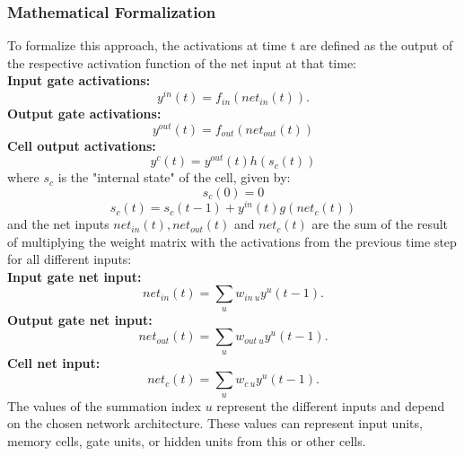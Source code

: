 \documentclass[twoside,a4paper,10pt,DIV=12,BCOR=12mm]{scrartcl}
\begin{document}
\subsubsection{Mathematical Formalization}
To formalize this approach, the activations at time t are defined as the output of the respective activation function of the net input at that time:\\
\textbf{Input gate activations:}
\begin{equation}
\label{eqn:poo-act-in}
y^{in}(t)=f_{in}\left(net_{in}(t)\right).
\end{equation}
\textbf{Output gate activations:}
\begin{equation}
\label{eqn:poo-act-out}
y^{out}(t)=f_{out}\left(net_{out}(t)\right)
\end{equation}
\textbf{Cell output activations:}
\begin{equation}
\label{eqn:poo-act-c}
y^{c}(t)=y^{out}(t)h\left(s_c(t)\right)
\end{equation}
where \begin{math}s_c\end{math} is the "internal state" of the cell, given by:
\begin{equation}
\label{eqn:poo-state0}
s_c(0)=0
\end{equation}
\begin{equation}
\label{eqn:poo-state}
s_c(t)=s_c(t-1)+y^{in}(t)g\left(net_c(t)\right)
\end{equation}
and the net inputs \begin{math}net_{in}(t), net_{out}(t)\end{math} and \begin{math}net_c(t)\end{math} are the sum of the result of multiplying the weight matrix with the activations from the previous time step for all different inputs:\\
\textbf{Input gate net input:}
\begin{equation}
\label{eqn:poo-net-in}
net_{in}(t)=\sum_{u}{w_{in\ u}}y^u(t-1).
\end{equation}
\textbf{Output gate net input:}
\begin{equation}
   \label{eqn:poo-net-out}
   net_{out}(t)=\sum_{u}{w_{out\ u}}y^u(t-1).
\end{equation}
\textbf{Cell net input:}
\begin{equation}
   \label{eqn:poo-net-c}
   net_{c}(t)=\sum_{u}{w_{c\ u}}y^u(t-1).
\end{equation}
The values of the summation index \begin{math}u\end{math} represent the different inputs and depend on the chosen network architecture. These values can represent input units, memory cells, gate units, or hidden units from this or other cells.
\end{document}
